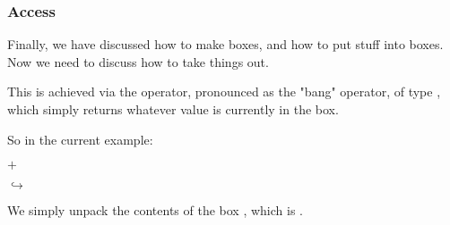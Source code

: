 \documentclass[aspectratio=169]{beamer}
\begin{document}
\begin{frame}[fragile]
  \frametitle{ Access}

  Finally, we have discussed how to make boxes, and how to put stuff into boxes.
  Now we need to discuss how to take things out.

  \pause
  \vspace{\fill}

  This is achieved via the \code{!} operator, pronounced as the "bang" operator,
  of type , which simply returns whatever value is currently
  in the box.

  \pause
  \vspace{\fill}

  So in the current example:

  \begin{center}
    \begin{minipage}{0.15\textwidth}
      \centering
    \end{minipage}
    \begin{minipage}{0.1\textwidth}
      \centering
      $+$
    \end{minipage}
    \begin{minipage}{0.15\textwidth}
      \centering
    \end{minipage}
    \begin{minipage}{0.1\textwidth}
      \centering
      $\hookrightarrow$
    \end{minipage}
    \begin{minipage}{0.15\textwidth}
      \centering
    \end{minipage}
  \end{center}

  \pause
  \vspace{\fill}

  We simply unpack the contents of the box , which is .
\end{frame}
\end{document}
